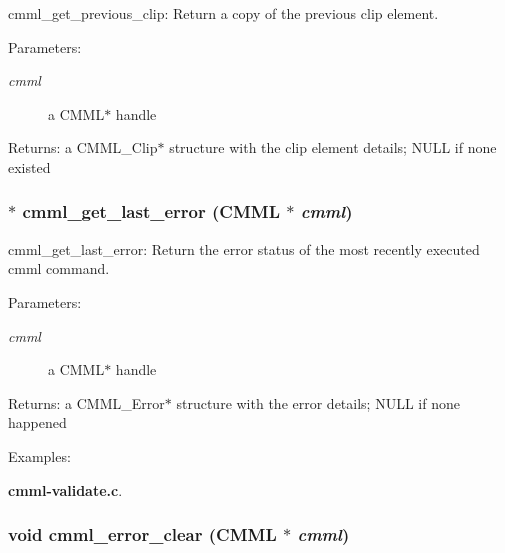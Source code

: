 cmml\_\-get\_\-previous\_\-clip: Return a copy of the previous clip element.

\begin{Desc}
\item[Parameters:]
\begin{description}
\item[{\em cmml}]a CMML$\ast$ handle\end{description}
\end{Desc}
\begin{Desc}
\item[Returns:]a CMML\_\-Clip$\ast$ structure with the clip element details; NULL if none existed \end{Desc}
\subsubsection{$\ast$ cmml\_\-get\_\-last\_\-error ({\bf CMML} $\ast$ {\em cmml})}\label{cmml_8h_a49}


cmml\_\-get\_\-last\_\-error: Return the error status of the most recently executed cmml command.

\begin{Desc}
\item[Parameters:]
\begin{description}
\item[{\em cmml}]a CMML$\ast$ handle\end{description}
\end{Desc}
\begin{Desc}
\item[Returns:]a CMML\_\-Error$\ast$ structure with the error details; NULL if none happened \end{Desc}
\begin{Desc}
\item[Examples: ]\par
{\bf cmml-validate.c}.\end{Desc}
\subsubsection{\setlength{\rightskip}{0pt plus 5cm}void cmml\_\-error\_\-clear ({\bf CMML} $\ast$ {\em cmml})}\label{cmml_8h_a50}


